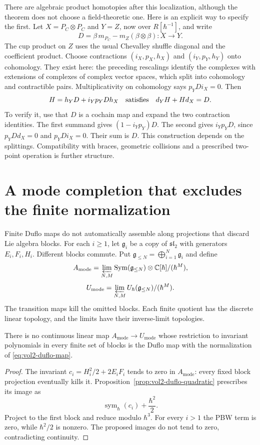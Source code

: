 There are algebraic product homotopies after this
localization, although the theorem does not
choose a field-theoretic one.
Here is an explicit way to specify the first.
Let $X=P_C\otimes P_C$ and $Y=Z$, now over
$R[\hbar^{-1}]$, and write
\[
 D=\beta\,m_{P_C}-m_Z(\beta\otimes\beta):X\longrightarrow Y.
\]
The cup product on $Z$ uses the usual Chevalley
shuffle diagonal and the coefficient product.
Choose contractions $(i_X,p_X,h_X)$ and
$(i_Y,p_Y,h_Y)$ onto cohomology.
They exist here: the preceding rescalings identify
the complexes with extensions of complexes of
complex vector spaces, which split into cohomology
and contractible pairs.
Multiplicativity on cohomology says $p_YDi_X=0$.
Then
\begin{equation}\label{eq:vol2-colour-cup-homotopy}
 H=h_YD+i_Yp_YDh_X
 \quad\hbox{satisfies}\quad d_YH+Hd_X=D.
\end{equation}
To verify it, use that $D$ is a cochain map and
expand the two contraction identities.
The first summand gives $(1-i_Yp_Y)D$.
The second gives $i_Yp_YD$, since
$p_YDd_X=0$ and $p_YDi_X=0$.
Their sum is $D$.
This construction depends on the splittings.
Compatibility with braces, geometric collisions
and a prescribed two-point operation is further
structure.

\section{A mode completion that excludes the finite normalization}
\label{sec:vol2-wheel-mode-obstruction}

Finite Duflo maps do not automatically assemble along
projections that discard Lie algebra blocks.
For each $i\geq1$, let $\mathfrak g_i$ be a copy
of $\mathfrak{sl}_2$ with generators $E_i,F_i,H_i$.
Different blocks commute. Put
$\mathfrak g_{\leq N}=\bigoplus_{i=1}^N\mathfrak g_i$
and define
\[
 A_{\mathrm{mode}}=
 \varprojlim_{N,M}
       \operatorname{Sym}(\mathfrak g_{\leq N})
                  \otimes\mathbb C[\hbar]/(\hbar^M),
\]
\[
 U_{\mathrm{mode}}=
 \varprojlim_{N,M}
       U_\hbar(\mathfrak g_{\leq N})/(\hbar^M).
\]
The transition maps kill the omitted blocks.
Each finite quotient has the discrete linear topology,
and the limits have their inverse-limit topologies.

\begin{proposition}\label{prop:vol2-mode-duflo-obstruction}
There is no continuous linear map
$A_{\mathrm{mode}}\to U_{\mathrm{mode}}$ whose
restriction to invariant polynomials in every finite
set of blocks is the Duflo map with the normalization
of \eqref{eq:vol2-duflo-map}.
\end{proposition}
\begin{proof}
The invariant
$c_i=H_i^2/2+2E_iF_i$ tends to zero in
$A_{\mathrm{mode}}$: every fixed block projection
eventually kills it.
Proposition~\ref{prop:vol2-duflo-quadratic} prescribes
its image as
\[
 \operatorname{sym}_\hbar(c_i)+\frac{\hbar^2}{2}.
\]
Project to the first block and reduce modulo
$\hbar^3$. For every $i>1$ the PBW term is zero,
while $\hbar^2/2$ is nonzero.
The proposed images do not tend to zero, contradicting
continuity.
\end{proof}

